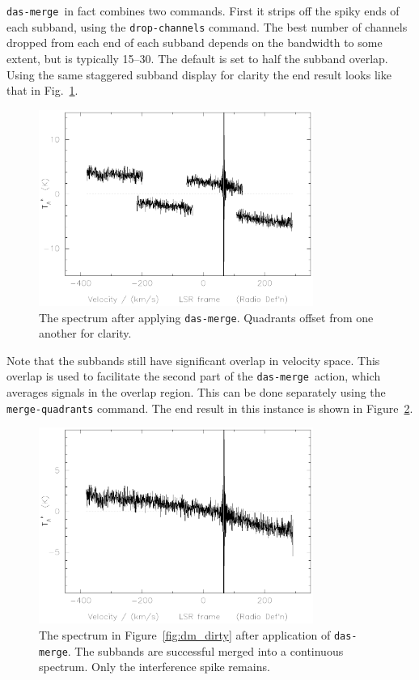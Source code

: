 \documentclass[11pt,twoside]{starlink}
\providecommand{\dm}{\texttt{das-merge}}
\begin{document}
\dm\ in fact combines two commands. First it strips off the spiky ends of each
subband, using the \texttt{drop-channels} command. The best number of
channels dropped from each end of each subband depends on the
bandwidth to some extent, but is typically 15--30. The default is set
to half the subband overlap. Using the same staggered subband display
for clarity the end result looks like that in Fig.~\ref{fig:after-das-merge}.

\begin{figure}[ht]
\centering
\includegraphics[width=0.8\textwidth]{sc8_dm_drop}
\caption[After \texttt{das-merge}]
{\small{The spectrum after applying \texttt{das-merge}. Quadrants offset
from one another for clarity.}}
\label{fig:after-das-merge}
\end{figure}

Note that the subbands still have significant overlap in velocity
space. This overlap is used to facilitate the second part of the \dm\
action, which averages signals in the overlap region. This can be done
separately using the \texttt{merge-quadrants} command. The end result in this
instance is shown in Figure~\ref{fig:dm_dasmerge}.
%
\begin{figure}[htb]
\centering
\includegraphics[width=0.8\textwidth]{sc8_dm_dasmerge}
\caption[Spectrum after \dm ]
{\small{The spectrum in Figure~\ref{fig:dm_dirty} after application of
\dm .  The subbands are successful merged into a continuous
spectrum. Only the interference spike remains.}}
\label{fig:dm_dasmerge}
\end{figure}
\end{document}
